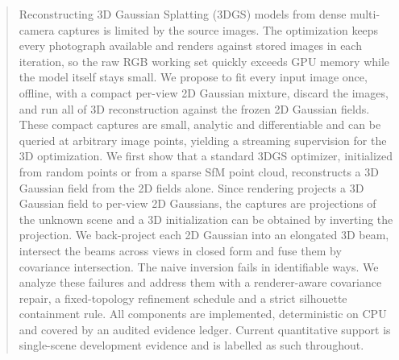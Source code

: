 \begin{abstract}
\noindent
Reconstructing 3D Gaussian Splatting (3DGS) models from dense multi-camera captures is
limited by the source images.  The optimization keeps every photograph available and
renders against stored images in each iteration, so the raw RGB working set quickly exceeds
GPU memory while the model itself stays small.  We propose to fit every input image once,
offline, with a compact per-view 2D Gaussian mixture, discard the images, and run all of 3D
reconstruction against the frozen 2D Gaussian fields.  These compact captures are small,
analytic and differentiable and can be queried at arbitrary image points, yielding a
streaming supervision for the 3D optimization.  We first show that a standard 3DGS
optimizer, initialized from random points or from a sparse SfM point cloud, reconstructs a
3D Gaussian field from the 2D fields alone.  
Since rendering projects a 3D Gaussian field to per-view 2D Gaussians, the captures are
projections of the unknown scene and a 3D initialization can be obtained by inverting the
projection.  We back-project each 2D Gaussian into an elongated 3D beam, intersect the
beams across views in closed form and fuse them by covariance intersection.  The naive
inversion fails in identifiable ways.  We analyze these failures and address them with a
renderer-aware covariance repair, a fixed-topology refinement schedule and a strict
silhouette containment rule.  
All components are implemented, deterministic on CPU and covered by an audited evidence
ledger.  Current quantitative support is single-scene development evidence and is labelled
as such throughout.
\end{abstract}
